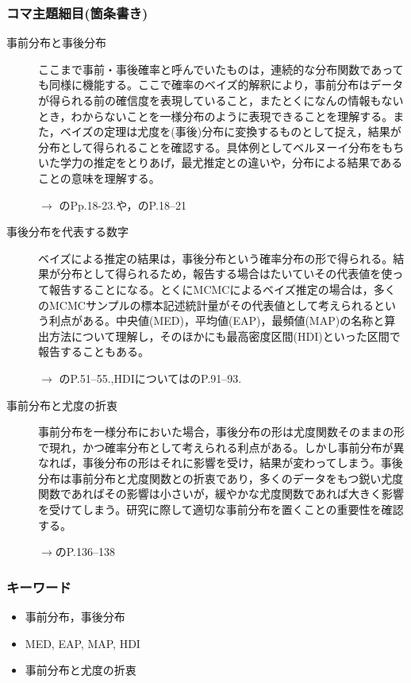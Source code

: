 \subsubsection{コマ主題細目(箇条書き)}
\begin{description}
	\item[事前分布と事後分布] ここまで事前・事後確率と呼んでいたものは，連続的な分布関数であっても同様に機能する。ここで確率のベイズ的解釈により，事前分布はデータが得られる前の確信度を表現していること，またとくになんの情報もないとき，わからないことを一様分布のように表現できることを理解する。また，ベイズの定理は尤度を(事後)分布に変換するものとして捉え，結果が分布として得られることを確認する。具体例としてベルヌーイ分布をもちいた学力の推定をとりあげ，最尤推定との違いや，分布による結果であることの意味を理解する。
	      \begin{flushright}
		      $\to$ \textcite{Maeda2017}のPp.18-23.や，\textcite{Toyoda201606}のP.18--21
	      \end{flushright}

	\item[事後分布を代表する数字]ベイズによる推定の結果は，事後分布という確率分布の形で得られる。結果が分布として得られるため，報告する場合はたいていその代表値を使って報告することになる。とくにMCMCによるベイズ推定の場合は，多くのMCMCサンプルの標本記述統計量がその代表値として考えられるという利点がある。中央値(MED)，平均値(EAP)，最頻値(MAP)の名称と算出方法について理解し，そのほかにも最高密度区間(HDI)といった区間で報告することもある。
	      \begin{flushright}
		      $\to$ \textcite{Toyoda201506}のP.51--55.,HDIについては\textcite{Maeda2017}のP.91--93.
	      \end{flushright}

	\item[事前分布と尤度の折衷]事前分布を一様分布においた場合，事後分布の形は尤度関数そのままの形で現れ，かつ確率分布として考えられる利点がある。しかし事前分布が異なれば，事後分布の形はそれに影響を受け，結果が変わってしまう。事後分布は事前分布と尤度関数との折衷であり，多くのデータをもつ鋭い尤度関数であればその影響は小さいが，緩やかな尤度関数であれば大きく影響を受けてしまう。研究に際して適切な事前分布を置くことの重要性を確認する。
	      \begin{flushright}
		      $\to$\textcite{Maeda2017}のP.136--138
	      \end{flushright}

\end{description}
\subsubsection{キーワード}
\begin{itemize}
	\item 事前分布，事後分布
	\item MED, EAP, MAP, HDI
	\item 事前分布と尤度の折衷
\end{itemize}

